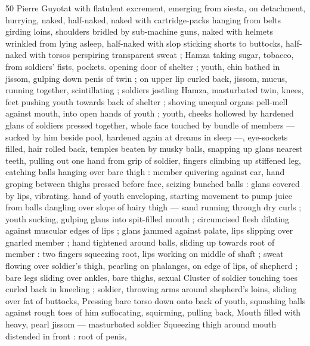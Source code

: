 50 Pierre Guyotat
with flatulent excrement, emerging from siesta, on detachment,
hurrying, naked, half-naked, naked with cartridge-packs hanging
from belts girding loins, shoulders bridled by sub-machine guns,
naked with helmets wrinkled from lying asleep, half-naked with slop
sticking shorts to buttocks, half-naked with torsos perspiring
transparent sweat ; Hamza taking sugar, tobacco, from soldiers’ fists,
pockets. opening door of shelter ; youth, chin bathed in jissom,
gulping down penis of twin ; on upper lip curled back, jissom, mucus,
running together, scintillating ; soldiers jostling Hamza, masturbated
twin, knees, feet pushing youth towards back of shelter ; shoving
unequal organs pell-mell against mouth, into open hands of youth ;
youth, cheeks hollowed by hardened glans of soldiers pressed
together, whole face touched by bundle of members — sucked by
him beside pool, hardened again at dreams in sleep —, eye-sockets
filled, hair rolled back, temples beaten by musky balls, snapping up
glans nearest teeth, pulling out one hand from grip of soldier, fingers
climbing up stiffened leg, catching balls hanging over bare thigh :
member quivering against ear, hand groping between thighs pressed
before face, seizing bunched balls : glans covered by lips, vibrating.
hand of youth enveloping, starting movement to pump juice from
balls dangling over slope of hairy thigh — sand running through dry
curls ; youth sucking, gulping glans into spit-filled mouth ;
circumcised flesh dilating against muscular edges of lips ; glans
jammed against palate, lips slipping over gnarled member ; hand
tightened around balls, sliding up towards root of member : two
fingers squeezing root, lips working on middle of shaft ; sweat
flowing over soldier's thigh, pearling on phalanges, on edge of lips,
of shepherd ; bare legs sliding over ankles, bare thighs, sexual
Cluster of soldier touching toes curled back in kneeling ; soldier,
throwing arms around shepherd's loins, sliding over fat of buttocks,
Pressing bare torso down onto back of youth, squashing balls
against rough toes of him suffocating, squirming, pulling back,
Mouth filled with heavy, pearl jissom — masturbated soldier
Squeezing thigh around mouth distended in front : root of penis,

